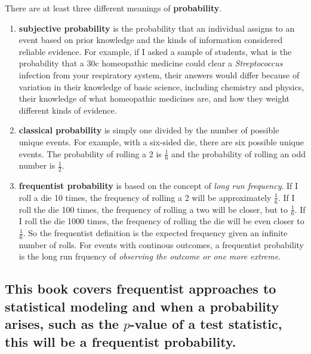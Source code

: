 \documentclass[]{book}
\begin{document}
There are at least three different meanings of \textbf{probability}.

\begin{enumerate}
\def\labelenumi{\arabic{enumi}.}
\item
  \textbf{subjective probability} is the probability that an individual
  assigns to an event based on prior knowledge and the kinds of
  information considered reliable evidence. For example, if I asked a
  sample of students, what is the probability that a 30c homeopathic
  medicine could clear a \emph{Streptococcus} infection from your
  respiratory system, their answers would differ because of variation in
  their knowledge of basic science, including chemistry and physics,
  their knowledge of what homeopathic medicines are, and how they weight
  different kinds of evidence.
\item
  \textbf{classical probability} is simply one divided by the number of
  possible unique events. For example, with a six-sided die, there are
  six possible unique events. The probability of rolling a 2 is
  \(\frac{1}{6}\) and the probability of rolling an odd number is
  \(\frac{1}{2}\).
\item
  \textbf{frequentist probability} is based on the concept of
  \textit{long run frequency}. If I roll a die 10 times, the frequency
  of rolling a 2 will be approximately \(\frac{1}{6}\). If I roll the
  die 100 times, the frequency of rolling a two will be closer, but to
  \(\frac{1}{6}\). If I roll the die 1000 times, the frequency of
  rolling the die will be even closer to \(\frac{1}{6}\). So the
  frequentist definition is the expected frequency given an infinite
  number of rolls. For events with continous outcomes, a frequentist
  probability is the long run frquency of \emph{observing the outcome or
  one more extreme}.
\end{enumerate}

\subsection{\texorpdfstring{This book covers frequentist approaches to
statistical modeling and when a probability arises, such as the
\(p\)-value of a test statistic, this will be a frequentist
probability.}{This book covers frequentist approaches to statistical modeling and when a probability arises, such as the p-value of a test statistic, this will be a frequentist probability.}}\label{this-book-covers-frequentist-approaches-to-statistical-modeling-and-when-a-probability-arises-such-as-the-p-value-of-a-test-statistic-this-will-be-a-frequentist-probability.}
\end{document}
